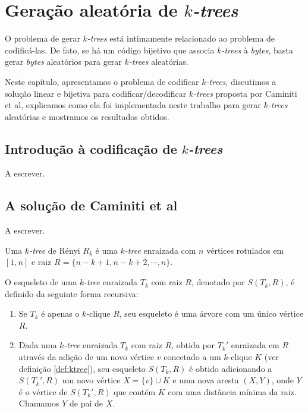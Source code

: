 \chapter{Geração aleatória de \emph{$k$-trees}}
\label{cap:geracao}

O problema de gerar \emph{$k$-trees} está intimamente relacionado ao problema de codificá-las. De fato, se há um código bijetivo que associa \emph{$k$-trees} à \emph{bytes}, basta gerar \emph{bytes} aleatórios para gerar \emph{$k$-trees} aleatórias.

Neste capítulo, apresentamos o problema de codificar \emph{$k$-trees}, discutimos a solução linear e bijetiva para codificar/decodificar \emph{$k$-trees} proposta por Caminiti et al\cite{caminiti}, explicamos como ela foi implementada neste trabalho para gerar \emph{$k$-trees} aleatórias e mostramos os resultados obtidos.

\section{Introdução à codificação de \emph{$k$-trees}}

A escrever. %

\section{A solução de Caminiti et al}

A escrever. %

\begin{definition}
  \cite{renyi} Uma \emph{$k$-tree} de Rényi $R_k$ é uma \emph{$k$-tree} enraizada com $n$ vértices rotulados em $[1, n]$ e raiz $R = \{n-k+1, n-k+2, \cdots, n\}$.
\end{definition}

\begin{definition}
  \label{def:skeleton}
  \cite{caminiti} O esqueleto de uma \emph{$k$-tree} enraizada $T_k$ com raiz $R$, denotado por $S(T_k, R)$, é definido da seguinte forma recursiva:

  \begin{enumerate}
    \item Se $T_k$ é apenas o $k$-clique $R$, seu esqueleto é uma árvore com um único vértice $R$.
    \item Dada uma \emph{$k$-tree} enraizada $T_k$ com raiz $R$, obtida por $T_k'$ enraizada em $R$ através da adição de um novo vértice $v$ conectado a um $k$-clique $K$ (ver definição \ref{def:ktree}), seu esqueleto $S(T_k, R)$ é obtido adicionando a $S(T_k', R)$ um novo vértice $X = \{v\} \cup K$ e uma nova aresta $(X, Y)$, onde $Y$ é o vértice de $S(T_k', R)$ que contém $K$ com uma distância mínima da raiz. Chamamos $Y$ de pai de $X$.
  \end{enumerate}
\end{definition}

